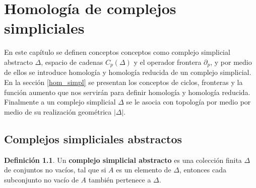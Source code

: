 \documentclass[12pt]{book}
\theoremstyle{definition}
\newtheorem{definition}[theorem]{Definición}
\newtheorem{lemma}[theorem]{Lema}
\newcounter{in}
\newcounter{ini}
\newcommand{\rep}{A}
\begin{document}



\chapter{Homología de complejos simpliciales}
\label{hsc}

En este capítulo se definen conceptos conceptos como
complejo simplicial abstracto $\Delta$, espacio de cadenas
$C_{p}(\Delta)$ y el operador frontera $\partial_{p}$, y por medio de
ellos se introduce homología y homología reducida de un complejo
simplicial. En la sección \ref{hom_simpl} se presentan los conceptos
de ciclos, fronteras y la función aumento que nos servirán para
definir homología y homología reducida. Finalmente a un complejo
simplicial $\Delta$ se le asocia con topología por medio por medio
de su realización geométrica $|\Delta|$.

\section{Complejos simpliciales abstractos}
\label{asc}

\begin{definition}
  \label{dasc}
  Un \textbf{complejo simplicial abstracto} es una colección
  finita $\Delta$ de conjuntos no vacíos, tal que si $A$ es un
  elemento de $\Delta$, entonces cada subconjunto no vacío de $A$
  también pertenece a $\Delta$.
\end{definition}
\end{document}
